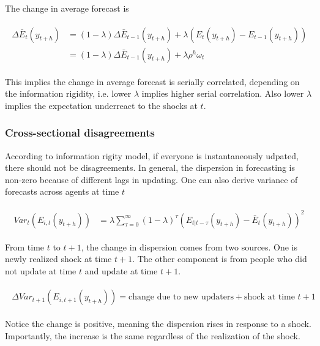 \documentclass[]{article}
\begin{document}
The change in average forecast is 

\begin{eqnarray}
\begin{aligned}
\Delta \bar E_t(y_{t+h})&  = (1-\lambda) \Delta \bar E_{t-1}(y_{t+h}) + \lambda (E_t(y_{t+h}) - E_{t-1}(y_{t+h})) \\ 
& = (1-\lambda) \Delta \bar E_{t-1}(y_{t+h}) + \lambda \rho^h \omega_t 
\end{aligned}
\end{eqnarray}

This implies the change in average forecast is serially correlated, depending on the information rigidity, i.e. lower $\lambda$ implies higher serial correlation. Also lower $\lambda$ implies the expectation underreact to the shocks at $t$. 

\subsubsection{Cross-sectional disagreements}

According to information rigity model, if everyone is instantaneously udpated, there should not be disagreements. In general, the dispersion in forecasting is non-zero because of different lags in updating. One can also derive variance of forecasts across agents at time $t$ 

\begin{eqnarray}
\begin{aligned}
Var_t(E_{i,t}(y_{t+h}) ) & = \lambda \sum^{\infty}_{\tau=0} (1-\lambda)^{\tau} (E_{t|t-\tau}(y_{t+h}) - \bar E_t(y_{t+h}))^2  
\end{aligned}
\end{eqnarray}

From time $t$ to $t+1$, the change in dispersion comes from two sources. One is newly realized shock at time $t+1$. The other component is from people who did not update at time $t$ and update at time $t+1$.  

\begin{eqnarray}
\begin{aligned}
\Delta Var_{t+1}(E_{i,t+1}(y_{t+h})) = \textrm{change due to new updaters} + \textrm{shock at time } t+1 
\end{aligned}
\end{eqnarray}


Notice the change is positive, meaning the dispersion rises in response to a shock. Importantly, the increase is the same regardless of the realization of the shock. 
\end{document}
